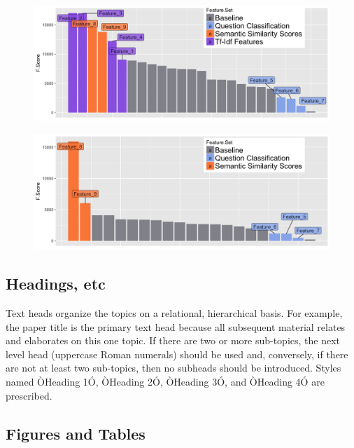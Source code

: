 \documentclass[letterpaper, 10 pt, conference]{ieeeconf}  %
\begin{document}
\begin{figure}[t]
\centering
\begin{minipage}{.5\textwidth}
  \centering
  \includegraphics[width=1\linewidth]{full_bars}
  \label{fig:test1}
\end{minipage}%
\begin{minipage}{.5\textwidth}
  \centering
  \includegraphics[width=1\linewidth]{no_tfidf_bars}
  \label{fig:test2}
\end{minipage}
\end{figure}

\subsection{Headings, etc}

Text heads organize the topics on a relational, hierarchical basis. For example, the paper title is the primary text head because all subsequent material relates and elaborates on this one topic. If there are two or more sub-topics, the next level head (uppercase Roman numerals) should be used and, conversely, if there are not at least two sub-topics, then no subheads should be introduced. Styles named ÒHeading 1Ó, ÒHeading 2Ó, ÒHeading 3Ó, and ÒHeading 4Ó are prescribed.



\subsection{Figures and Tables}
\end{document}
